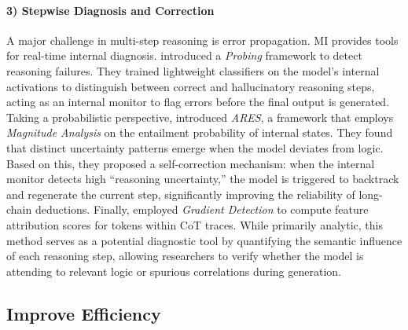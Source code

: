 \documentclass[11pt,letterpaper]{mystyle}
\begin{document}
  \paragraph{3) Stepwise Diagnosis and Correction}
  A major challenge in multi-step reasoning is error propagation. MI provides tools for real-time internal diagnosis.
  \citet{sun-etal-2025-probing_emnlp2025} introduced a \textit{Probing} framework to detect reasoning failures. They trained lightweight classifiers on the model's internal activations to distinguish between correct and hallucinatory reasoning steps, acting as an internal monitor to flag errors before the final output is generated.
  Taking a probabilistic perspective, \citet{you-etal-2025-probabilistic_emnlp2025} introduced \textit{ARES}, a framework that employs \textit{Magnitude Analysis} on the entailment probability of internal states. They found that distinct uncertainty patterns emerge when the model deviates from logic. Based on this, they proposed a self-correction mechanism: when the internal monitor detects high ``reasoning uncertainty,'' the model is triggered to backtrack and regenerate the current step, significantly improving the reliability of long-chain deductions.
  Finally, \citet{wu2023analyzing} employed \textit{Gradient Detection} to compute feature attribution scores for tokens within CoT traces. While primarily analytic, this method serves as a potential diagnostic tool by quantifying the semantic influence of each reasoning step, allowing researchers to verify whether the model is attending to relevant logic or spurious correlations during generation.
  


\subsection{Improve Efficiency}
\label{sec:improve_efficiency}
\end{document}
